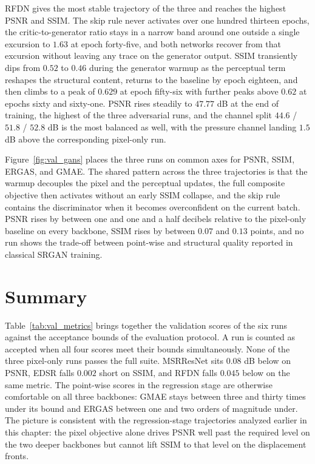 RFDN gives the most stable trajectory of the three and reaches the highest PSNR and SSIM. The skip rule never activates over one hundred thirteen epochs, the critic-to-generator ratio stays in a narrow band around one outside a single excursion to $1.63$ at epoch forty-five, and both networks recover from that excursion without leaving any trace on the generator output. SSIM transiently dips from $0.52$ to $0.46$ during the generator warmup as the perceptual term reshapes the structural content, returns to the baseline by epoch eighteen, and then climbs to a peak of $0.629$ at epoch fifty-six with further peaks above $0.62$ at epochs sixty and sixty-one. PSNR rises steadily to $47.77$ dB at the end of training, the highest of the three adversarial runs, and the channel split $44.6$ / $51.8$ / $52.8$ dB is the most balanced as well, with the pressure channel landing $1.5$ dB above the corresponding pixel-only run.

Figure~\ref{fig:val_gans} places the three runs on common axes for PSNR, SSIM, ERGAS, and GMAE. The shared pattern across the three trajectories is that the warmup decouples the pixel and the perceptual updates, the full composite objective then activates without an early SSIM collapse, and the skip rule contains the discriminator when it becomes overconfident on the current batch. PSNR rises by between one and one and a half decibels relative to the pixel-only baseline on every backbone, SSIM rises by between $0.07$ and $0.13$ points, and no run shows the trade-off between point-wise and structural quality reported in classical SRGAN training.


\section*{Summary}
\label{sec:results_summary}

Table~\ref{tab:val_metrics} brings together the validation scores of the six runs against the acceptance bounds of the evaluation protocol. A run is counted as accepted when all four scores meet their bounds simultaneously. None of the three pixel-only runs passes the full suite. MSRResNet sits $0.08$ dB below on PSNR, EDSR falls $0.002$ short on SSIM, and RFDN falls $0.045$ below on the same metric. The point-wise scores in the regression stage are otherwise comfortable on all three backbones: GMAE stays between three and thirty times under its bound and ERGAS between one and two orders of magnitude under. The picture is consistent with the regression-stage trajectories analyzed earlier in this chapter: the pixel objective alone drives PSNR well past the required level on the two deeper backbones but cannot lift SSIM to that level on the displacement fronts.

